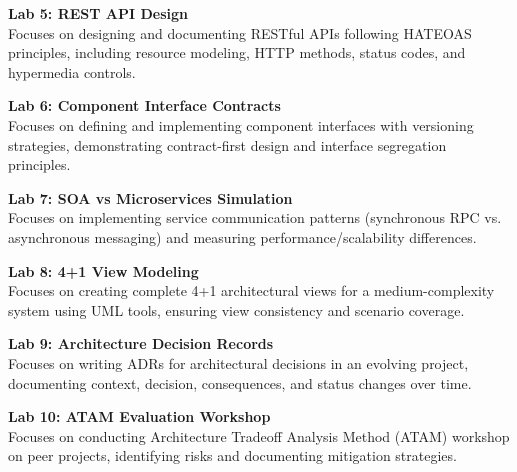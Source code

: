\vspace{0.2cm}

\noindent\textbf{Lab 5: REST API Design} \\
Focuses on designing and documenting RESTful APIs following HATEOAS principles, including resource modeling, HTTP methods, status codes, and hypermedia controls.

\vspace{0.2cm}

\noindent\textbf{Lab 6: Component Interface Contracts} \\
Focuses on defining and implementing component interfaces with versioning strategies, demonstrating contract-first design and interface segregation principles.

\vspace{0.2cm}

\noindent\textbf{Lab 7: SOA vs Microservices Simulation} \\
Focuses on implementing service communication patterns (synchronous RPC vs. asynchronous messaging) and measuring performance/scalability differences.

\vspace{0.2cm}

\noindent\textbf{Lab 8: 4+1 View Modeling} \\
Focuses on creating complete 4+1 architectural views for a medium-complexity system using UML tools, ensuring view consistency and scenario coverage.

\vspace{0.2cm}

\noindent\textbf{Lab 9: Architecture Decision Records} \\
Focuses on writing ADRs for architectural decisions in an evolving project, documenting context, decision, consequences, and status changes over time.

\vspace{0.2cm}

\noindent\textbf{Lab 10: ATAM Evaluation Workshop} \\
Focuses on conducting Architecture Tradeoff Analysis Method (ATAM) workshop on peer projects, identifying risks and documenting mitigation strategies.

\vspace{0.2cm}

\newpage
{}

